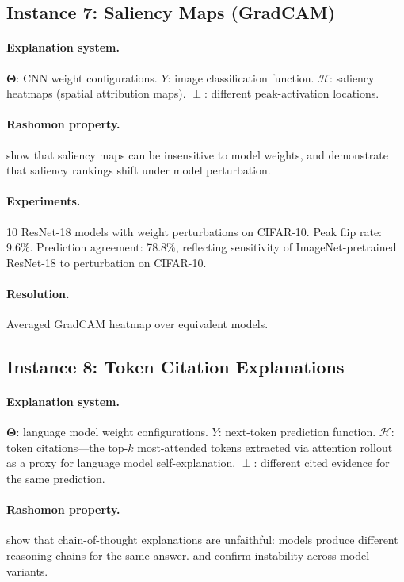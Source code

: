 \documentclass[11pt]{article}
\newcommand{\Params}{\mathbf{\Theta}}
\newcommand{\sH}{\mathcal{H}}
\newcommand{\incomp}{\perp}
\begin{document}
\subsection{Instance 7: Saliency Maps (GradCAM)}

\paragraph{Explanation system.}
$\Params$: CNN weight configurations.
$Y$: image classification function.
$\sH$: saliency heatmaps (spatial attribution maps).
$\incomp$: different peak-activation locations.

\paragraph{Rashomon property.}
\citet{adebayo2018sanity} show that saliency maps can be insensitive to
model weights, and \citet{hooker2019benchmark} demonstrate that saliency
rankings shift under model perturbation.

\paragraph{Experiments.}
10 ResNet-18 models with weight perturbations on CIFAR-10.
Peak flip rate: 9.6\%. Prediction agreement: 78.8\%, reflecting sensitivity of
ImageNet-pretrained ResNet-18 to perturbation on CIFAR-10.

\paragraph{Resolution.}
Averaged GradCAM heatmap over equivalent models.

\subsection{Instance 8: Token Citation Explanations}

\paragraph{Explanation system.}
$\Params$: language model weight configurations.
$Y$: next-token prediction function.
$\sH$: token citations---the top-$k$ most-attended tokens extracted via
attention rollout as a proxy for language model self-explanation.
$\incomp$: different cited evidence for the same prediction.

\paragraph{Rashomon property.}
\citet{turpin2024language} show that chain-of-thought explanations are
unfaithful: models produce different reasoning chains for the same
answer. \citet{lanham2023measuring} and \citet{ye2022unreliability}
confirm instability across model variants.
\end{document}
